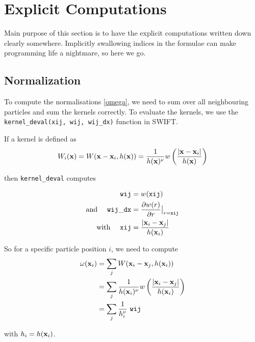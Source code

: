 \section{Explicit Computations}

Main purpose of this section is to have the explicit computations written down clearly somewhere.
Implicitly swallowing indices in the formulae can make programming life a nightmare, so here we go.



\subsection{Normalization}


To compute the normalisations \ref{omega}, we need to sum over all neighbouring particles and sum the kernels correctly.
To evaluate the kernels, we use the \verb|kernel_deval(xij, wij, wij_dx)| function in SWIFT.

If a kernel is defined as
\begin{align*}
	W_i(\mathbf{x}) = W(\mathbf{x} - \mathbf{x}_i, h(\mathbf{x})) = \frac{1}{h(\mathbf{x})^\nu} w\left(\frac{| \mathbf{x} - \mathbf{x}_i |}{h(\mathbf{x})} \right)
\end{align*}

then \verb|kernel_deval| computes 

\begin{align*}
	\mathtt{wij} &= w(\mathtt{xij}) \\
	\text{and \quad} \mathtt{wij\_dx} &= \frac{\partial w(r)}{\partial r} \big{|} _{r = \mathtt{xij}} \\ 
	\text{with \quad} \mathtt{xij} &= \frac{| \mathbf{x}_i - \mathbf{x}_j |}{h(\mathbf{x}_i)}
\end{align*}



So for a specific particle position $i$, we need to compute
\begin{align*}
	\omega(\x_i) 	&= \sum_j W(\x_i - \x_j, h(\x_i)) \\
					&= \sum_j \frac{1}{h(\x_i)^\nu} w\left( \frac{| \x_i - \x_j |}{h(\x_i)} \right) \\
					&= \sum_j \frac{1}{h_i^\nu} \ \mathtt{ wij }
\end{align*}


with $h_i = h(\mathbf{x}_i)$.








